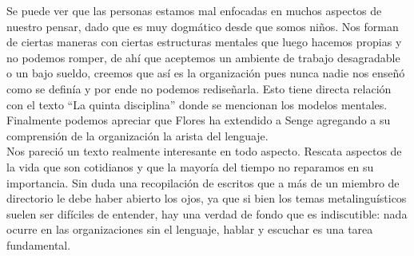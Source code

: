 Se puede ver que las personas estamos mal enfocadas en muchos aspectos de nuestro pensar,
 dado que es muy dogm\'atico desde que somos ni\~nos. Nos forman de ciertas maneras con ciertas
estructuras mentales que luego hacemos propias y no podemos romper, de ah\'i que aceptemos
un ambiente de trabajo desagradable o un bajo sueldo, creemos que as\'i es la organizaci\'on pues
nunca nadie nos ense\~n\'o como se defin\'ia y por ende no podemos redise\~narla. Esto tiene directa
relaci\'on con el texto ``La quinta disciplina'' donde se mencionan los modelos mentales.\\

Finalmente podemos apreciar que Flores ha extendido a Senge agregando a su comprensi\'on
de la organizaci\'on la arista del lenguaje.\\

Nos pareci\'o un texto realmente interesante en todo aspecto. Rescata aspectos de la vida
que son cotidianos y que la mayor\'ia del tiempo no reparamos en su importancia. Sin duda una recopilaci\'on
de escritos que a m\'as de un miembro de directorio le debe haber abierto los ojos, ya
que si bien los temas metalingu\'isticos suelen ser dif\'iciles de entender, hay una verdad de fondo que
es indiscutible: nada ocurre en las organizaciones sin el lenguaje, hablar y escuchar es una tarea
fundamental.
\vspace{15cm}
